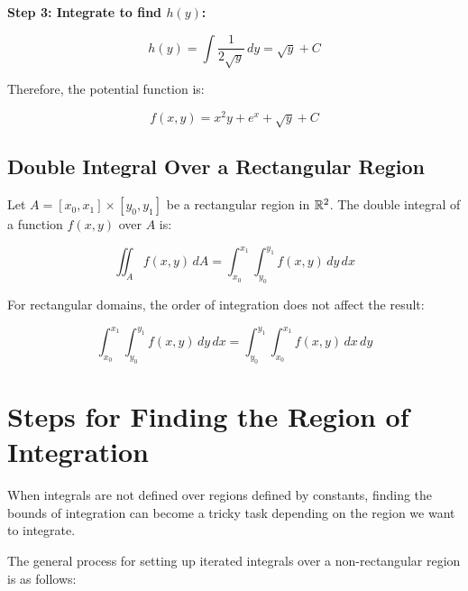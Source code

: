 \textbf{Step 3: Integrate to find \( h(y) \):}

\[
    h(y) = \int \frac{1}{2\sqrt{y}}\,dy = \sqrt{y} + C
\]

Therefore, the potential function is:

\[
    f(x, y) = x^2y + e^x + \sqrt{y} + C
\]

\subsection{Double Integral Over a Rectangular Region}

Let \( A = [x_0, x_1] \times [y_0, y_1] \) be a rectangular region in \( \mathbb{R}^2 \). The double 
integral of a function \( f(x, y) \) over \(A\) is:

\[
    \iint_A f(x, y)\, dA = \int_{x_0}^{x_1} \int_{y_0}^{y_1} f(x, y)\, dy\, dx
\]

For rectangular domains, the order of integration does not affect the result:

\[
    \int_{x_0}^{x_1} \int_{y_0}^{y_1} f(x, y)\, dy\, dx = \int_{y_0}^{y_1} \int_{x_0}^{x_1} 
    f(x, y)\, dx\, dy
\]

\section{Steps for Finding the Region of Integration}

When integrals are not defined over regions defined by constants, finding the bounds 
of integration can become a tricky task depending on the region we want to integrate.

The general process for setting up iterated integrals over a non-rectangular region is as follows:

